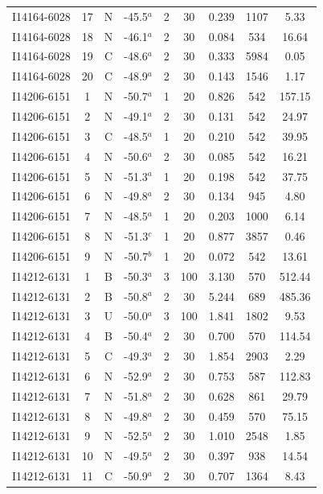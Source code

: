 \begin{table}
\begin{tabular}{ccccccccc}
I14164-6028 & 17 & N & -45.5$^{a}$ & 2 & 30 & 0.239 & 1107 & 5.33 \\
I14164-6028 & 18 & N & -46.1$^{a}$ & 2 & 30 & 0.084 & 534 & 16.64 \\
I14164-6028 & 19 & C & -48.6$^{a}$ & 2 & 30 & 0.333 & 5984 & 0.05 \\
I14164-6028 & 20 & C & -48.9$^{a}$ & 2 & 30 & 0.143 & 1546 & 1.17 \\
I14206-6151 & 1 & N & -50.7$^{a}$ & 1 & 20 & 0.826 & 542 & 157.15 \\
I14206-6151 & 2 & N & -49.1$^{a}$ & 2 & 30 & 0.131 & 542 & 24.97 \\
I14206-6151 & 3 & C & -48.5$^{a}$ & 1 & 20 & 0.210 & 542 & 39.95 \\
I14206-6151 & 4 & N & -50.6$^{a}$ & 2 & 30 & 0.085 & 542 & 16.21 \\
I14206-6151 & 5 & N & -51.3$^{a}$ & 1 & 20 & 0.198 & 542 & 37.75 \\
I14206-6151 & 6 & N & -49.8$^{a}$ & 2 & 30 & 0.134 & 945 & 4.80 \\
I14206-6151 & 7 & N & -48.5$^{a}$ & 1 & 20 & 0.203 & 1000 & 6.14 \\
I14206-6151 & 8 & N & -51.3$^{c}$ & 1 & 20 & 0.877 & 3857 & 0.46 \\
I14206-6151 & 9 & N & -50.7$^{b}$ & 1 & 20 & 0.072 & 542 & 13.61 \\
I14212-6131 & 1 & B & -50.3$^{a}$ & 3 & 100 & 3.130 & 570 & 512.44 \\
I14212-6131 & 2 & B & -50.8$^{a}$ & 2 & 30 & 5.244 & 689 & 485.36 \\
I14212-6131 & 3 & U & -50.0$^{a}$ & 3 & 100 & 1.841 & 1802 & 9.53 \\
I14212-6131 & 4 & B & -50.4$^{a}$ & 2 & 30 & 0.700 & 570 & 114.54 \\
I14212-6131 & 5 & C & -49.3$^{a}$ & 2 & 30 & 1.854 & 2903 & 2.29 \\
I14212-6131 & 6 & N & -52.9$^{a}$ & 2 & 30 & 0.753 & 587 & 112.83 \\
I14212-6131 & 7 & N & -51.8$^{a}$ & 2 & 30 & 0.628 & 861 & 29.79 \\
I14212-6131 & 8 & N & -49.8$^{a}$ & 2 & 30 & 0.459 & 570 & 75.15 \\
I14212-6131 & 9 & N & -52.5$^{a}$ & 2 & 30 & 1.010 & 2548 & 1.85 \\
I14212-6131 & 10 & N & -49.5$^{a}$ & 2 & 30 & 0.397 & 938 & 14.54 \\
I14212-6131 & 11 & C & -50.9$^{a}$ & 2 & 30 & 0.707 & 1364 & 8.43 \\

\end{tabular}
\end{table}
